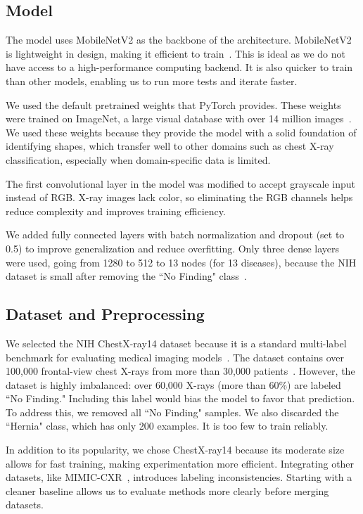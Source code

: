 \documentclass[12pt]{article}
\begin{document}
\begin{multicols}{2}
\subsection{Model}

The model uses MobileNetV2 as the backbone of the architecture. MobileNetV2 is lightweight in design, making it efficient to train~\cite{howard2019mobilenetv2}. This is ideal as we do not have access to a high-performance computing backend. It is also quicker to train than other models, enabling us to run more tests and iterate faster.

We used the default pretrained weights that PyTorch provides. These weights were trained on ImageNet, a large visual database with over 14 million images~\cite{imagenet}. We used these weights because they provide the model with a solid foundation of identifying shapes, which transfer well to other domains such as chest X-ray classification, especially when domain-specific data is limited.

The first convolutional layer in the model was modified to accept grayscale input instead of RGB. X-ray images lack color, so eliminating the RGB channels helps reduce complexity and improves training efficiency.

We added fully connected layers with batch normalization and dropout (set to 0.5) to improve generalization and reduce overfitting. Only three dense layers were used, going from 1280 to 512 to 13 nodes (for 13 diseases), because the NIH dataset is small after removing the ``No Finding" class~\cite{nih_dataset}.

\subsection{Dataset and Preprocessing}

We selected the NIH ChestX-ray14 dataset because it is a standard multi-label benchmark for evaluating medical imaging models~\cite{wang2017chestx}. The dataset contains over 100,000 frontal-view chest X-rays from more than 30,000 patients~\cite{nih_dataset}. However, the dataset is highly imbalanced: over 60,000 X-rays (more than 60\%) are labeled ``No Finding." Including this label would bias the model to favor that prediction. To address this, we removed all ``No Finding" samples. We also discarded the ``Hernia" class, which has only 200 examples. It is too few to train reliably.

In addition to its popularity, we chose ChestX-ray14 because its moderate size allows for fast training, making experimentation more efficient. Integrating other datasets, like MIMIC-CXR~\cite{mimic}, introduces labeling inconsistencies. Starting with a cleaner baseline allows us to evaluate methods more clearly before merging datasets.


\end{multicols}
\end{document}
